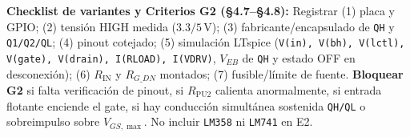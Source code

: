 \documentclass[10pt, a4paper, landscape]{article}
\begin{document}
\vspace{0.1cm}
\noindent
\textbf{Checklist de variantes y Criterios G2 (\S 4.7--\S 4.8):} Registrar (1) placa y GPIO; (2) tensión HIGH medida ($3.3/5\,\text{V}$); (3) fabricante/encapsulado de \texttt{QH} y \texttt{Q1/Q2/QL}; (4) pinout cotejado; (5) simulación LTspice (\texttt{V(in), V(bh), V(lctl), V(gate), V(drain), I(RLOAD), I(VDRV)}, $V_{EB}$ de \texttt{QH} y estado OFF en desconexión); (6) $R_{\text{IN}}$ y $R_{G\_DN}$ montados; (7) fusible/límite de fuente. \textbf{Bloquear G2} si falta verificación de pinout, si $R_{\text{PU2}}$ calienta anormalmente, si entrada flotante enciende el gate, si hay conducción simultánea sostenida \texttt{QH/QL} o sobreimpulso sobre $V_{GS,\max}$. No incluir \texttt{LM358} ni \texttt{LM741} en E2.
\end{document}
